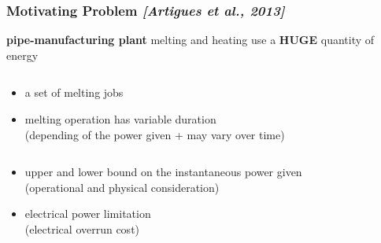 \begin{frame}
  \frametitle{Motivating Problem 
    {\small \it \color{gray!50!black!50} [Artigues et al., 2013]}}
  \vfill 
  \begin{block}{\bf \large  pipe-manufacturing plant} 
    melting and heating use a {\bf HUGE} quantity of energy
  \end{block}
  \vfill
  \begin{columns}
    \begin{column}{0.5\linewidth}
      \begin{itemize}
      \item a set of melting jobs
        \vspace{0.4cm}
      \item melting operation has variable duration\\
        {\small (depending of the power given + may vary over time)}
        \vspace{0.4cm}
      \end{itemize}     
    \end{column}
    \hfill 
    \begin{column}{0.4\linewidth}
    \end{column}
  \end{columns}
  \vfill
  \begin{itemize}
  \item upper and lower bound on the instantaneous power given \\
    {\small(operational and physical consideration)}
    \vspace{0.4cm}
  \item electrical power limitation\\
    {\small(electrical overrun cost)}
  \end{itemize}
\end{frame}


